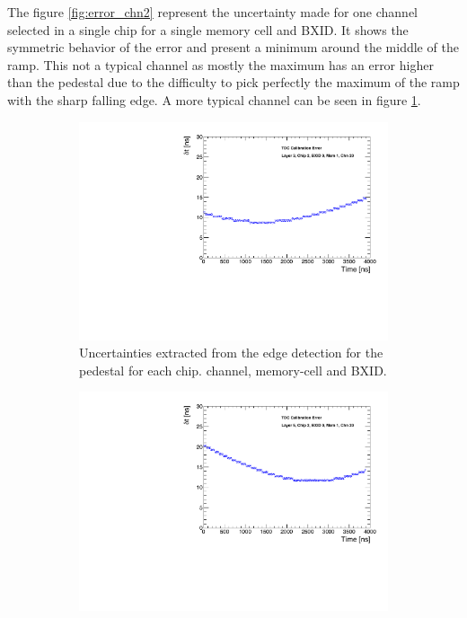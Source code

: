 The figure \ref{fig:error_chn2} represent the uncertainty made for one channel selected in a single chip for a single memory cell and BXID. It shows the symmetric behavior of the error and present a minimum around the middle of the ramp. This not a typical channel as mostly the maximum has an error higher than the pedestal due to the difficulty to pick perfectly the maximum of the ramp with the sharp falling edge. A more typical channel can be seen in figure \ref{fig:error_chn}.

\begin{figure}[htbp!]
	\begin{subfigure}[t]{0.49\textwidth}
		\centering
		\includegraphics[width=1\linewidth]{chap5/fig_AHCAL_timing/Muons/TimeErrorEstimation_Layer3.pdf}
		\caption{Uncertainties extracted from the edge detection for the pedestal for each chip. channel, memory-cell and BXID.} \label{fig:error_chn}
	\end{subfigure}
	\hfill
	\begin{subfigure}[t]{0.49\textwidth}
		\centering
		\includegraphics[width=1\linewidth]{chap5/fig_AHCAL_timing/Muons/TimeErrorEstimation_Layer5.pdf}

\end{subfigure}
\end{figure}
